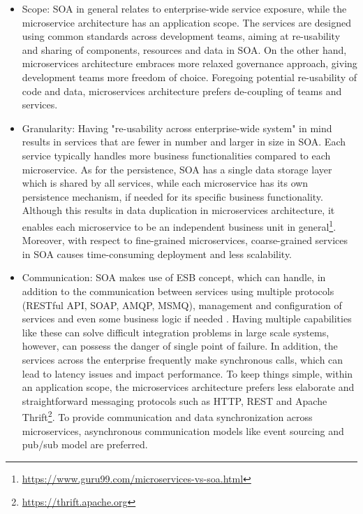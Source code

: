 \documentclass{Configuration_Files/PoliMi3i_thesis}
\begin{document}
\begin{itemize}
    \item Scope: SOA in general relates to enterprise-wide service exposure, while the microservice architecture has an application scope.
    The services are designed using common standards across development teams, aiming at re-usability and sharing of components, resources and data in SOA.
    On the other hand, microservices architecture embraces more relaxed governance approach, giving development teams more freedom of choice.
    Foregoing potential re-usability of code and data, microservices architecture prefers de-coupling of teams and services.
    
    \item Granularity: Having "re-usability across enterprise-wide system" in mind results in services that are fewer in number and larger in size in SOA.
    Each service typically handles more business functionalities compared to each microservice.
    As for the persistence, SOA has a single data storage layer which is shared by all services, while each microservice has its own persistence mechanism, if needed for its specific business functionality.
    Although this results in data duplication in microservices architecture, it enables each microservice to be an independent business unit in general\footnote{\href{https://www.guru99.com/microservices-vs-soa.html}{https://www.guru99.com/microservices-vs-soa.html}}.
    Moreover, with respect to fine-grained microservices, coarse-grained services in SOA causes time-consuming deployment and less scalability.
    
    \item Communication: SOA makes use of ESB concept, which can handle, in addition to the communication between services using multiple protocols (RESTful API, SOAP, AMQP, MSMQ), management and configuration of services and even some business logic if needed \cite{soa_comm}.
    Having multiple capabilities like these can solve difficult integration problems in large scale systems, however, can possess the danger of single point of failure.
    In addition, the services across the enterprise frequently make synchronous calls, which can lead to latency issues and impact performance.
    To keep things simple, within an application scope, the microservices architecture prefers less elaborate and straightforward  messaging protocols such as HTTP, REST and Apache Thrift\footnote{\href{https://thrift.apache.org}{https://thrift.apache.org}}.
    To provide communication and data synchronization across microservices, asynchronous communication models like event sourcing and pub/sub model are preferred.
\end{itemize}
\end{document}
